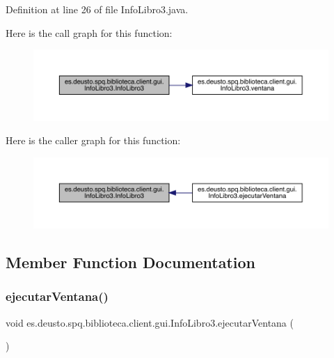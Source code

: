 Definition at line 26 of file Info\+Libro3.\+java.

Here is the call graph for this function\+:
\nopagebreak
\begin{figure}[H]
\begin{center}
\leavevmode
\includegraphics[width=350pt]{classes_1_1deusto_1_1spq_1_1biblioteca_1_1client_1_1gui_1_1_info_libro3_aab0c4bc9236b13b4398d658d38697b73_cgraph}
\end{center}
\end{figure}
Here is the caller graph for this function\+:
\nopagebreak
\begin{figure}[H]
\begin{center}
\leavevmode
\includegraphics[width=350pt]{classes_1_1deusto_1_1spq_1_1biblioteca_1_1client_1_1gui_1_1_info_libro3_aab0c4bc9236b13b4398d658d38697b73_icgraph}
\end{center}
\end{figure}


\subsection{Member Function Documentation}
\mbox{\label{classes_1_1deusto_1_1spq_1_1biblioteca_1_1client_1_1gui_1_1_info_libro3_a688fb88d1ba1c2b6fb5e48e786dfd0e4}} 
\subsubsection{\texorpdfstring{ejecutar\+Ventana()}{ejecutarVentana()}}
{\footnotesize\ttfamily void es.\+deusto.\+spq.\+biblioteca.\+client.\+gui.\+Info\+Libro3.\+ejecutar\+Ventana (\begin{DoxyParamCaption}{ }\end{DoxyParamCaption})}



